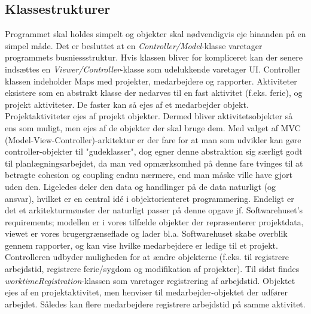 \subsection{Klassestrukturer} Programmet skal holdes simpelt og objekter skal nødvendigvis eje hinanden på en simpel måde. Det er besluttet at en \emph{Controller/Model}-klasse varetager programmets busniessstruktur. Hvis klassen bliver for kompliceret kan der senere indsættes en \emph{Viewer/Controller}-klasse som udelukkende varetager UI. Controller klassen indeholder Maps med projekter, medarbejdere og rapporter. Aktiviteter eksistere som en abstrakt klasse der nedarves til en fast aktivitet (f.eks. ferie), og projekt aktiviteter. De faster kan så ejes af et medarbejder objekt. Projektaktiviteter ejes af projekt objekter. Dermed bliver aktivitetsobjekter så ens som muligt, men ejes af de objekter der skal bruge dem. Med valget af MVC (Model-View-Controller)-arkitektur er der fare for at man som udvikler kan gøre controller-objekter til "gudeklasser", dog egner denne abstraktion sig særligt godt til planlægningsarbejdet, da man ved opmærksomhed på denne fare tvinges til at betragte cohesion og coupling endnu nærmere, end man måske ville have gjort uden den. Ligeledes deler den data og handlinger på de data naturligt (og ansvar), hvilket er en central idé i objektorienteret programmering. Endeligt er det et arkitekturmønster der naturligt passer på denne opgave jf. Softwarehuset's requirements; modellen er i vores tilfælde objekter der repræsenterer projektdata, viewet er vores brugergrænseflade og lader bl.a. Softwarehuset skabe overblik gennem rapporter, og kan vise hvilke medarbejdere er ledige til et projekt. Controlleren udbyder muligheden for at ændre objekterne (f.eks. til registrere arbejdstid, registrere ferie/sygdom og modifikation af projekter).\newline
Til sidst findes \emph{worktimeRegistration}-klassen som varetager registrering af arbejdstid. Objektet ejes af en projektaktivitet, men henviser til medarbejder-objektet der udfører arbejdet. Således kan flere medarbejdere registrere arbejdstid på samme aktivitet.